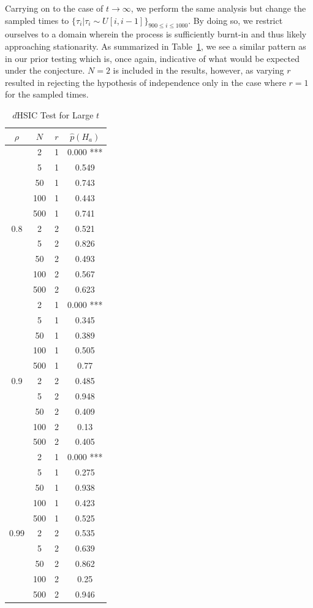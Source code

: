 Carrying on to the case of $t \rightarrow \infty$, we perform the same analysis but change the sampled times to
$\{\tau_{i} | \tau_{i} \sim U[i,i-1]\}_{900 \leq i \leq 1000}$.
By doing so, we restrict ourselves to a domain wherein the process is sufficiently burnt-in and thus likely approaching stationarity.
As summarized in Table~\ref{tab:longtime}, we see a similar pattern as in our prior testing which is, once again, indicative
of what would be expected under the conjecture.
$N=2$ is included in the results, however, as varying $r$ resulted in rejecting the hypothesis of independence only in the case where $r=1$ for the sampled times.
\begin{table}
    \centering
    \caption{$d$HSIC Test for Large $t$}
    \label{tab:longtime}
    \begin{tabular}{|c|c|c|c|}
\hline
$\rho$ & $N$ & $r$ & $\hat p(H_{a})$ \\
\hline
\hline
 & 2 & 1 & 0.000 *** \\
 & 5 & 1 & 0.549  \\
 & 50 & 1 & 0.743  \\
 & 100 & 1 & 0.443  \\
 & 500 & 1 & 0.741  \\
0.8 & 2 & 2 & 0.521  \\
 & 5 & 2 & 0.826  \\
 & 50 & 2 & 0.493  \\
 & 100 & 2 & 0.567  \\
 & 500 & 2 & 0.623  \\
\hline
 & 2 & 1 & 0.000 *** \\
 & 5 & 1 & 0.345  \\
 & 50 & 1 & 0.389  \\
 & 100 & 1 & 0.505  \\
 & 500 & 1 & 0.77  \\
0.9 & 2 & 2 & 0.485  \\
 & 5 & 2 & 0.948  \\
 & 50 & 2 & 0.409  \\
 & 100 & 2 & 0.13  \\
 & 500 & 2 & 0.405  \\
\hline
 & 2 & 1 & 0.000 *** \\
 & 5 & 1 & 0.275  \\
 & 50 & 1 & 0.938  \\
 & 100 & 1 & 0.423  \\
 & 500 & 1 & 0.525  \\
0.99 & 2 & 2 & 0.535  \\
 & 5 & 2 & 0.639  \\
 & 50 & 2 & 0.862  \\
 & 100 & 2 & 0.25  \\
 & 500 & 2 & 0.946  \\
        \hline


\end{tabular}
\end{table}
